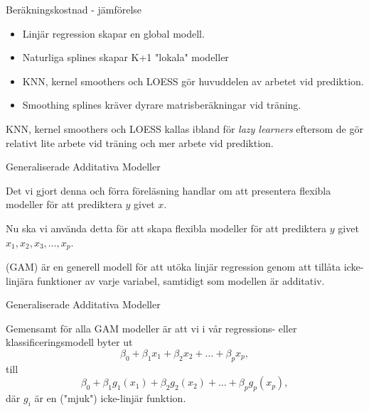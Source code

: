 \documentclass[10pt,english]{beamer}
\begin{document}
\begin{frame}{Beräkningskostnad - jämförelse}


    \begin{itemize}
        \item Linjär regression  skapar en global modell.
        \item Naturliga splines skapar K+1 "lokala" modeller
        \item KNN, kernel smoothers och LOESS gör huvuddelen av arbetet vid prediktion.
        \item Smoothing splines kräver dyrare matrisberäkningar vid träning.
    \end{itemize}

    \begin{greenbox}
        KNN, kernel smoothers och LOESS kallas ibland för
        \emph{lazy learners} eftersom de gör relativt lite arbete vid
        träning och mer arbete vid prediktion.
    \end{greenbox}

\end{frame}





\begin{frame}{Generaliserade Additativa Modeller}

    Det vi gjort denna och förra föreläsning handlar om att presentera flexibla modeller för att prediktera $y$ givet $x$.
    
    Nu ska vi använda detta för att skapa flexibla modeller för att prediktera $y$ givet $x_1, x_2, x_3, \ldots, x_p$.

    \begin{greenbox}
         (GAM) är en generell modell för att utöka linjär regression genom att tillåta icke-linjära funktioner av varje variabel, samtidigt som modellen är additativ.
    \end{greenbox}
    
\end{frame}

\begin{frame}{Generaliserade Additativa Modeller}
    
    Gemensamt för alla GAM modeller är att vi i vår regressions- eller klassificeringsmodell byter ut
    \begin{equation*}
        \beta_0 + \beta_1 x_1 + \beta_2 x_2 + \ldots + \beta_p x_p,
    \end{equation*}
    till
    \begin{equation*}
        \beta_0 + \beta_1 g_1(x_1) + \beta_2 g_2(x_2) + \ldots + \beta_p g_p(x_p),
    \end{equation*}
    där $g_i$ är en ("mjuk") icke-linjär funktion.

\end{frame}
\end{document}
